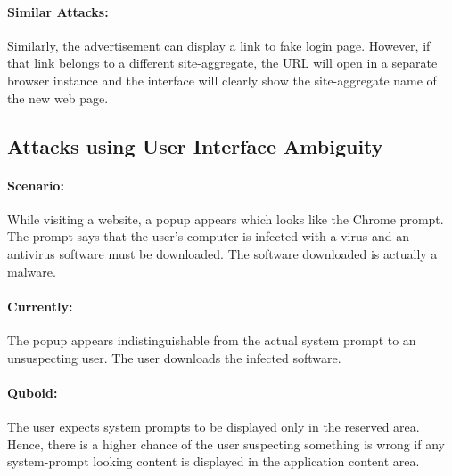\paragraph{Similar Attacks:} Similarly, the advertisement can display a link to fake login page. However, if that link belongs to a different site-aggregate, the URL will open in a separate browser instance and the interface will clearly show the site-aggregate name of the new web page.

\subsection{Attacks using User Interface Ambiguity}

\paragraph{Scenario:} While visiting a website, a popup appears which looks like the Chrome prompt. The prompt says that the user's computer is infected with a virus and an antivirus software must be downloaded. The software downloaded is actually a malware.

\paragraph{Currently:} The popup appears indistinguishable from the actual system prompt to an unsuspecting user. The user downloads the infected software.

\paragraph{Quboid:} The user expects system prompts to be displayed only in the reserved area. Hence, there is a higher chance of the user suspecting something is wrong if any system-prompt looking content is displayed in the application content area.




